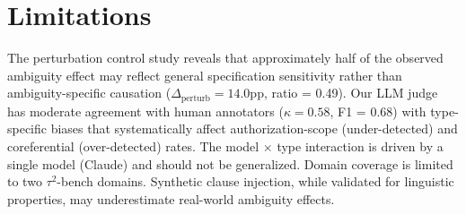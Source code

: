 \documentclass[11pt]{article}
\begin{document}
\section*{Limitations}
The perturbation control study reveals that approximately half of the observed ambiguity effect may reflect general specification sensitivity rather than ambiguity-specific causation ($\Delta_{\text{perturb}} = 14.0$pp, ratio = 0.49). Our LLM judge has moderate agreement with human annotators ($\kappa = 0.58$, F1 = 0.68) with type-specific biases that systematically affect authorization-scope (under-detected) and coreferential (over-detected) rates. The model $\times$ type interaction is driven by a single model (Claude) and should not be generalized. Domain coverage is limited to two $\tau^2$-bench domains. Synthetic clause injection, while validated for linguistic properties, may underestimate real-world ambiguity effects.
\end{document}
